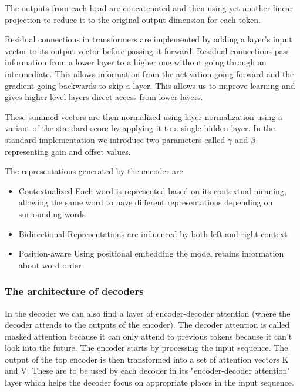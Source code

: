 The outputs from each head are concatenated and then using yet another linear projection to reduce it to the original output dimension for each token. 

\vspace{10pt}

Residual connections in transformers are implemented by adding a layer's input vector to its output vector before passing it forward. Residual connections pass information  from a lower layer to a higher one without going through an intermediate. This allows information from the activation going forward and the gradient going backwards to skip a layer. This allows us to improve learning and gives higher level layers direct access from lower layers. 

\vspace{10pt}

These summed vectors are then normalized using layer normalization using a variant of the standard score by applying it to a single hidden layer. In the standard implementation we introduce two parameters called $\gamma$ and $\beta$ representing gain and offset values. 

\vspace{10pt}

The representations generated by the encoder are 

\begin{itemize}
    \item Contextualized \ra Each word is represented based on its contextual meaning, allowing the same word to have different representations depending on surrounding words
    \item Bidirectional \ra Representations are influenced by both left and right context
    \item Position-aware \ra Using positional embedding the model retains information about word order
\end{itemize}

\subsubsection{The architecture of decoders}

In the decoder we can also find a layer of encoder-decoder attention (where the decoder attends to the outputs of the encoder). The decoder attention is called masked attention because it can only attend to previous tokens because it can't look into the future. The encoder starts by processing the input sequence. The output of the top encoder is then transformed into a set of attention vectors K and V. These are to be used by each decoder in its "encoder-decoder attention" layer which helps the decoder focus on appropriate places in the input sequence. 

